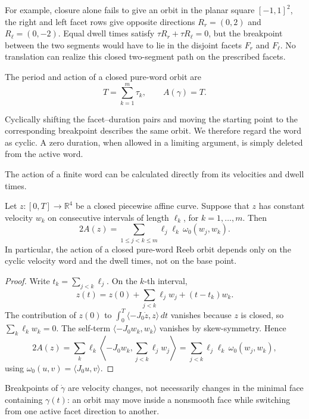 For example, closure alone fails to give an orbit in the
planar square \([-1,1]^2\), the right and left facet rows give opposite
directions \(R_r=(0,2)\) and \(R_\ell=(0,-2)\).  Equal dwell times satisfy
\(\tau R_r+\tau R_\ell=0\), but the breakpoint between the two segments would
have to lie in the disjoint facets \(F_r\) and \(F_\ell\).  No translation can
realize this closed two-segment path on the prescribed facets.

The period and action of a closed pure-word orbit are
\[
  T=\sum_{k=1}^m \tau_k,
  \qquad
  A(\gamma)=T.
\]


Cyclically shifting the facet--duration pairs and moving the starting point
to the corresponding breakpoint describes the same orbit. We therefore regard
the word as cyclic. A zero duration, when allowed in a limiting argument,
is simply deleted from the active word.

The action of a finite word can be calculated directly from its velocities and
dwell times.

\begin{lemma}\label{lem:preliminaries-shoelace}
Let \(z\colon[0,T]\to\mathbb{R}^4\) be a closed piecewise affine curve. Suppose
that \(z\) has constant velocity \(w_k\) on consecutive intervals of length
\(\ell_k\), for \(k=1,\ldots,m\). Then
\begin{equation}\label{eq:preliminaries-shoelace}
  2A(z)
  =
  \sum_{1\leq j<k\leq m}
    \ell_j\ell_k\,\omega_0(w_j,w_k).
\end{equation}
In particular, the action of a closed pure-word Reeb orbit depends only on the
cyclic velocity word and the dwell times, not on the base point.
\end{lemma}

\begin{proof}
Write \(t_k=\sum_{j<k}\ell_j\). On the \(k\)-th interval,
\[
  z(t)=z(0)+\sum_{j<k}\ell_jw_j+(t-t_k)w_k.
\]
The contribution of \(z(0)\) to
\(\int_0^T\langle -J_0\dot z,z\rangle\,dt\) vanishes because \(z\) is closed,
so \(\sum_k\ell_kw_k=0\). The self-term
\(\langle -J_0w_k,w_k\rangle\) vanishes by skew-symmetry. Hence
\[
  2A(z)
  =
  \sum_k
    \ell_k\left\langle -J_0w_k,\sum_{j<k}\ell_jw_j\right\rangle
  =
  \sum_{j<k}\ell_j\ell_k\,\omega_0(w_j,w_k),
\]
using \(\omega_0(u,v)=\langle J_0u,v\rangle\).
\end{proof}

Breakpoints of \(\dot{\gamma}\) are velocity changes, not necessarily changes
in the minimal face containing \(\gamma(t)\): an orbit may move inside a
nonsmooth face while switching from one active facet direction to another.

